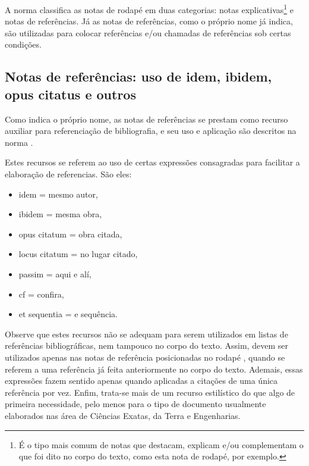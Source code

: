 \begin{apendicesenv}
    A norma  classifica as notas de rodapé em duas categorias: notas explicativas\footnote{É o tipo mais comum de notas que destacam, explicam e/ou complementam o que foi dito no corpo do texto, como esta nota de rodapé, por exemplo.} e notas de referências.
    Já as notas de referências, como o próprio nome já indica, são utilizadas para colocar referências e/ou chamadas de referências sob certas condições\footnotemark{}.


    \subsection{Notas de referências: uso de idem, ibidem, opus citatus e outros}
    \label{subsec_notas_de_referencias}

    Como indica o próprio nome, as notas de referências se prestam como recurso auxiliar para referenciação de bibliografia, e seu uso e aplicação são descritos na norma .

    Estes recursos se referem ao uso de certas expressões consagradas para facilitar a elaboração de referencias.
    São eles:

    \begin{itemize}
        \item idem = mesmo autor,
        \item ibidem = mesma obra,
        \item opus citatum = obra citada,
        \item locus citatum = no lugar citado,
        \item passim = aqui e alí,
        \item cf = confira,
        \item et sequentia = e sequência.
    \end{itemize}

    Observe que estes recursos não se adequam para serem utilizados em listas de referências bibliográficas, nem tampouco no corpo do texto.
    Assim, devem ser utilizados apenas nas notas de referência posicionadas no rodapé \cite[p.~6]{abnTeX22014c}, quando se referem a uma referência já feita anteriormente no corpo do texto.
    Ademais, essas expressões fazem sentido apenas quando aplicadas a citações de uma única referência por vez.
    Enfim, trata-se mais de um recurso estilístico do que algo de primeira necessidade, pelo menos para o tipo de documento usualmente elaborados nas área de Ciências Exatas, da Terra e Engenharias.


\end{apendicesenv}
